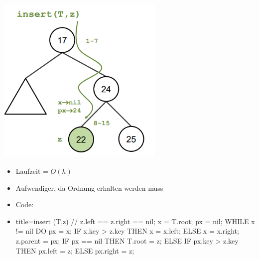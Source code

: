 \documentclass[
    12pt,
    a4paper,
    ngerman,
    color=3b,%
    marginpar=false,
    colorback=false,
    leqno,
]{tudaexercise}
\begin{document}
\begin{itemize}
\begin{itemize}
                    \includegraphics[width=8cm]{pictures/binärerSuchbaumEinfügen.PNG}
                    \begin{itemize}
                        \item Laufzeit = $O(h)$
                        \item Aufwendiger, da Ordnung erhalten werden muss
                        \item Code:
                        \item[]\label{BST-Insert}
                              \begin{ccode}[autogobble]{title={insert (T,z) // z.left == z.right == nil;}}
                                  x = T.root;
                                  px = nil;
                                  WHILE x != nil DO
                                    px = x;
                                    IF x.key > z.key THEN
                                        x = x.left;
                                    ELSE
                                        x = x.right;
                                  z.parent = px;
                                  IF px == nil THEN
                                    T.root = z;
                                  ELSE
                                    IF px.key > z.key THEN
                                        px.left = z;
                                    ELSE
                                        px.right = z;
                              \end{ccode}
                    \end{itemize}
          \end{itemize}

          \pagebreak


\end{itemize}
\end{document}
